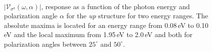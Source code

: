 \documentclass[prb,11pt,tightenlines,twocolumn,aps]{revtex4-1}
\begin{document}
\begin{figure}[t]
    \centering
    \\

    \caption{$|\mathcal{V}_{\sigma^{\mathrm{z}}}(\omega,\alpha)|$, response
    as a function of the photon energy and polarization angle $\alpha$ for the
    \emph{up} structure for two energy ranges. The absolute maxima is located
    for an energy range from 0.08\,eV to 0.10\,eV and the local maximum from
    1.95\,eV to 2.0\,eV and both for polarization angles between $25^{\circ}$
    and $50^{\circ}$.}
    \label{fig:up-3d-vsz}   
\end{figure}
\end{document}
